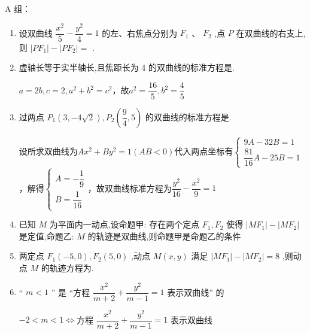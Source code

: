 A 组：
\begin{enumerate}
    \item 设双曲线 $\dfrac{{x}^{2}}{5} - \dfrac{{y}^{2}}{4} = 1$ 的左、右焦点分别为 ${F}_{1}$ 、 ${F}_{2}$ ,点 $P$ 在双曲线的右支上,则 $\left| {P{F}_{1}}\right|  - \left| {P{F}_{2}}\right|  =$ .
    
    \item 虚轴长等于实半轴长,且焦距长为 4 的双曲线的标准方程是.
    \begin{jieda}
        $a = 2b, c = 2, a^2+b^2 = c^2$，故$a^2 = \dfrac{16}{5}, b^2 = \dfrac{4}{5}$
    \end{jieda}
    
    \item 过两点 ${P}_{1}\left( {3, - 4\sqrt{2}}\right) ,{P}_{2}\left( {\dfrac{9}{4},5}\right)$ 的双曲线的标准方程是.
    \begin{jieda}
        设所求双曲线为$Ax^2+By^2 = 1(AB<0)$代入两点坐标有$\left\{\begin{array}{l}
             9A - 32B = 1 \\
             \dfrac{81}{16}A - 25B = 1
        \end{array}\right.$，解得$\left\{\begin{array}{l}
             A = -\dfrac{1}{9} \\
             B =  \dfrac{1}{16}
        \end{array}\right.$，故双曲线标准方程为$\dfrac{y^2}{16} - \dfrac{x^2}{9} = 1$
    \end{jieda}
    
    \item 已知 $M$ 为平面内一动点,设命题甲: 存在两个定点 ${F}_{1},{F}_{2}$ 使得 $\left|{M{F}_{1}}\right| - \left|{M{F}_{2}}\right|$ 是定值,命题乙: $M$ 的轨迹是双曲线,则命题甲是命题乙的条件
    
    \item 两定点 ${F}_{1}\left( {-5,0}\right) ,{F}_{2}\left( {5,0}\right)$ ,动点 $M\left( {x,y}\right)$ 满足 $\left| {M{F}_{1}}\right|  - \left| {M{F}_{2}}\right|  = 8$ ,则动点 $M$ 的轨迹方程为.
    
    \item “ $m < 1$ ” 是 “方程 $\dfrac{{x}^{2}}{m + 2} + \dfrac{{y}^{2}}{m - 1} = 1$ 表示双曲线” 的
    \begin{jieda}
        $-2 < m < 1 \Longleftrightarrow $方程 $\dfrac{{x}^{2}}{m + 2} + \dfrac{{y}^{2}}{m - 1} = 1$ 表示双曲线
    \end{jieda}
    

\end{enumerate}
